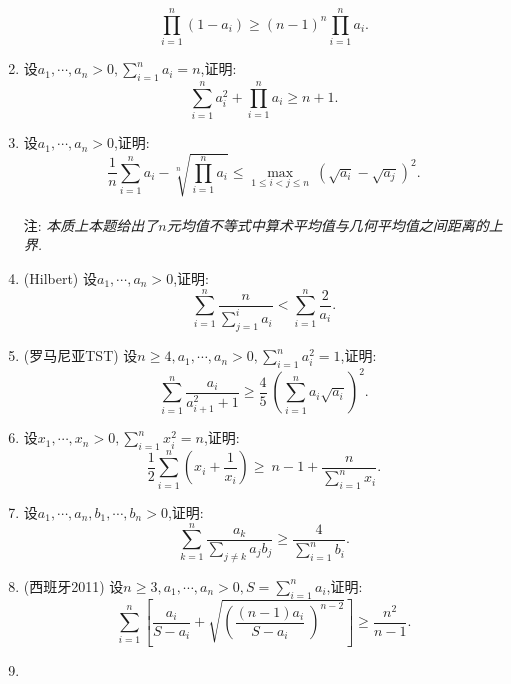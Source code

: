 \documentclass{article}
\begin{document}
\begin{enumerate}
            $$\prod_{i=1}^n{\left( 1-a_i \right)} \ge {\left( n-1 \right)}^n\prod_{i=1}^n {a_i}.$$
        \item 设$a_1,\cdots,a_n>0,\sum_{i=1}^n{a_i}=n$,证明:\ 
            $$\sum_{i=1}^n{a_i^2}+\prod_{i=1}^n{a_i}\ge n+1.$$
        \item 设$a_1,\cdots,a_n>0$,证明:\ 
            $$\frac{1}{n}\sum_{i=1}^n{a_i}-\sqrt[n]{\prod_{i=1}^n{a_i}}\le \max_{1\le i<j \le n} \ 
                {\left( \sqrt{a_i} - \sqrt{a_j} \right)}^2.$$
            \\ 注: \emph {本质上本题给出了$n$元均值不等式中算术平均值与几何平均值之间距离的上界.}
        \item (Hilbert) 设$a_1,\cdots,a_n>0$,证明:\ 
            $$\sum_{i=1}^n\frac{n}{\sum_{j=1}^{i}{a_i}}<\sum_{i=1}^n{\frac{2}{a_i}}.$$
        \item (罗马尼亚TST) 设$n\ge4,a_1,\cdots,a_n>0,\sum_{i=1}^n{a_i^2}=1$,证明:\ 
            $$\sum_{i=1}^n{\frac{a_i}{a_{i+1}^2+1}}\ge\frac{4}{5}\ 
            {\left( \sum_{i=1}^n{a_i \sqrt{a_i}}\right)}^2.$$
        \item 设$x_1,\cdots,x_n>0,\sum_{i=1}^n{x_i^2}=n$,证明: \ 
            $$\frac{1}{2}\sum_{i=1}^n{\left( x_i+\frac{1}{x_i} \right)}\ge \ 
                n-1+\frac{n}{\sum_{i=1}^{n}{x_i}}.$$
        \item 设$a_1,\cdots,a_n,b_1,\cdots,b_n>0$,证明:\ 
            $$\sum_{k=1}^n{\frac{a_k}{\sum_{j \ne k}{a_j b_j}}}\ge\frac{4}{\sum_{i=1}^n{b_i}}.$$
        \item (西班牙2011) 设$n\ge3,a_1,\cdots,a_n>0,S=\sum_{i=1}^n{a_i}$,证明: \ 
            $${\sum_{i = 1}^{n}\left\lbrack {\frac{a_{i}}{S - a_{i}} + \sqrt{\left( \frac{\left( {n - 1} \right)a_{i}}{S - a_{i}} \
             \right)^{n - 2}}} \right\rbrack} \geq \frac{n^{2}}{n - 1}.$$
        \item 
    \end{enumerate}
\end{document}
